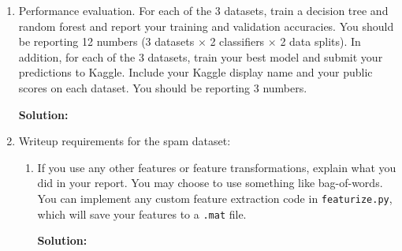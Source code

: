 \documentclass{article}
\newcommand{\solution}{\textbf{Solution: }}
\begin{document}
\begin{enumerate}
\begin{enumerate}
        \item How did you implement random forests?
        \begin{mdframed} \solution
        \end{mdframed}

        \item Anything else cool you implemented?
        \begin{mdframed} \solution
        \end{mdframed}
    \end{enumerate}

    \item Performance evaluation. For each of the 3 datasets, train a decision tree and random forest and report your training and validation accuracies. You should be reporting 12 numbers (3 datasets $\times$ 2 classifiers $\times$ 2 data splits). In addition, for each of the 3 datasets, train your best model and submit your predictions to Kaggle. Include your Kaggle display name and your public scores on each dataset. You should be reporting 3 numbers.
    \begin{mdframed}\solution
    \end{mdframed}

    \item Writeup requirements for the spam dataset:
    \begin{enumerate}
        \item If you use any other features or feature transformations, explain what you did in your report. You may choose to use something like bag-of-words. You can implement any custom feature extraction code in \texttt{featurize.py}, which will save your features to a \texttt{.mat} file.
        \begin{mdframed}\solution
        \end{mdframed}


\end{enumerate}
\end{enumerate}
\end{document}

